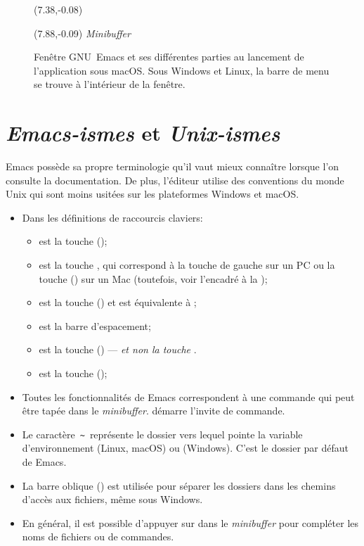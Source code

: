 \begin{figure}[t]
  \begin{textblock}{0.35}(7.38,-0.08)
    \Large\faLongArrowRight
  \end{textblock}
  \begin{textblock}{1.75}(7.88,-0.09)
    \footnotesize\sffamily \emph{Minibuffer}
  \end{textblock}
  \endgroup
  \caption{Fenêtre GNU~Emacs et ses différentes parties au lancement
    de l'application sous macOS. Sous Windows et Linux, la barre de
    menu se trouve à l'intérieur de la fenêtre.}
  \label{fig:ess:emacswindow}
\end{figure}


\section{\emph{Emacs-ismes} et \emph{Unix-ismes}}
\label{sec:emacs+ess:ismes}

Emacs possède sa propre terminologie qu'il vaut mieux connaître
lorsque l'on consulte la documentation. De plus, l'éditeur utilise des
conventions du monde Unix qui sont moins usitées sur les plateformes
Windows et macOS.

\begin{itemize}
\item Dans les définitions de raccourcis claviers:
  \begin{itemize}
  \item {} est la touche  (\ctlkey);
  \item {} est la touche , qui correspond à la touche
     de gauche sur un PC ou la touche 
    (\optkey) sur un Mac (toutefois, voir l'encadré à la
    );
  \item {} est la touche  (\esckey) et
    est équivalente à ;
  \item {} est la barre d'espacement;
  \item {} est la touche  (\delkey) ---
    \emph{et non la touche} .
  \item {} est la touche  (\returnkey);
  \end{itemize}
\item Toutes les fonctionnalités de Emacs correspondent à une commande
  qui peut être tapée dans le \emph{minibuffer}.  démarre
  l'invite de commande.
\item Le caractère \,\verb=~=\, représente le dossier vers lequel
  pointe la variable d'environnement  (Linux, macOS) ou
   (Windows). C'est le dossier par défaut de Emacs.
\item La barre oblique (\code{/}) est utilisée pour séparer les
  dossiers dans les chemins d'accès aux fichiers, même sous Windows.
\item En général, il est possible d'appuyer sur  dans le
  \emph{minibuffer} pour compléter les noms de fichiers ou de
  commandes.
\end{itemize}

